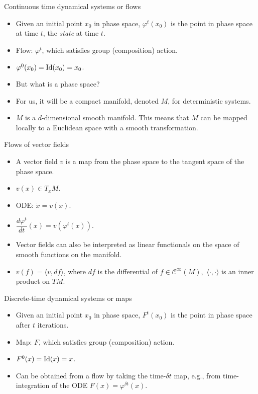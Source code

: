 \documentclass[final]{beamer}
\begin{document}
	\begin{frame}{Continuous time dynamical systems or flows}
	\begin{itemize}
		\item Given an initial point $x_0$ in phase space, $\varphi^t(x_0)$ is the point in phase space at time $t$, the \emph{state} at time $t.$
		\pause
		\item Flow: $\varphi^t$, which satisfies group (composition) action.
		\pause
		\item $\varphi^0(x_0) = {\rm Id}(x_0) = x_0$.
		\pause
		\item But what is a phase space?
		\pause
		\item For us, it will be a compact manifold, denoted $M$, for deterministic systems.
		\pause 
		\item $M$ is a $d$-dimensional smooth manifold. This means that $M$ can be mapped locally to a Euclidean space with a smooth transformation.
	\end{itemize}
	\end{frame}


	\begin{frame}{Flows of vector fields}
		\begin{itemize}
			\item A vector field $v$ is a map from the phase space to the tangent space of the phase space.
			\pause
			\item $v(x) \in T_xM$.
			\pause
			\item ODE: $\dot{x} = v(x)$.
			\pause
		\item $\dfrac{d\varphi^t}{dt}(x) = v(\varphi^t(x))$.
		\pause
		\item Vector fields can also be interpreted as linear functionals on the space of smooth functions on the manifold.
		\pause
		\item $v(f) = \langle v, df \rangle$, where $df$ is the differential of $f \in \mathcal{C}^\infty(M),$ $\langle \cdot, \cdot\rangle$ is an inner product on $TM$.

		\end{itemize}
	\end{frame}
	

	\begin{frame}{Discrete-time dynamical systems or maps}
		\begin{itemize}
			\item Given an initial point $x_0$ in phase space, $F^t(x_0)$ is the point in phase space after $t$ iterations.
			\pause
			\item Map: $F$, which satisfies group (composition) action.
			\pause
			\item $F^0(x) = {\rm Id}(x) = x$.
			\pause
		\item Can be obtained from a flow by taking the time-$\delta t$ map, e.g., from time-integration of the ODE $F(x) = \varphi^{\delta t}(x)$.
			
			
		\end{itemize}
	\end{frame}
\end{document}

